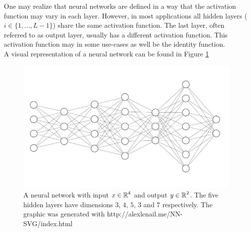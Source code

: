 One may realize that neural networks are defined in a way that the activation function may vary in each layer. However, in most applications all hidden layers ($i \in \{1, \ldots, L-1\}$) share the same activation function. The last layer, often referred to as output layer, usually has a different activation function. This activation function may in some use-cases as well be the identity function.\\
A visual representation of a neural network can be found in Figure \ref{img_nn}


\begin{figure}[H]
\begin{center}
   \begin{minipage}[b]{0.9\linewidth}
      \includegraphics[width=\linewidth]{neural_net}
      \caption{A neural network with input $x\in \operatorname{\mathbb{R}}^4$ and output $y\in\operatorname{\mathbb{R}}^2$. The five hidden layers have dimensions $3$, $4$, $5$, $3$ and $7$ respectively. The graphic was generated with http://alexlenail.me/NN-SVG/index.html}\label{img_nn}
	\end{minipage}
\end{center}
\end{figure}


